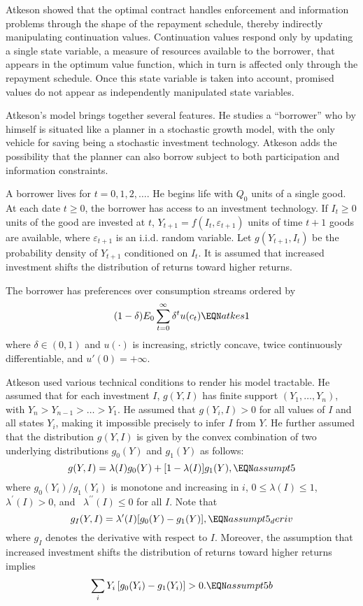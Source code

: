 Atkeson showed that the optimal contract  handles enforcement and information problems
through the shape of the repayment schedule, thereby indirectly manipulating continuation values.
  Continuation values respond only by updating
a single state variable, a measure of resources available to the
borrower, that appears in the optimum value function, which in turn
is affected only through the repayment schedule.  Once this state
variable is taken into account, promised values do not appear as
independently manipulated state variables.

Atkeson's model brings together several features.  He studies
a ``borrower'' who by himself is situated like a planner
in a stochastic growth model, with the only vehicle for saving
being a stochastic investment technology.  Atkeson adds the
possibility that the planner can also borrow
subject to both participation and information constraints.

A borrower lives for $t=0,1,2,\ldots $.  He begins life with $Q_{0}$
units of a single good.  At each date $t\geq 0$, the borrower has access
to an investment technology.  If $I_t\geq 0$ units of the good are
invested at  $t$, $Y_{t+1}=f(I_{t},\varepsilon_{t+1})$
units of time $t+1$  goods are available, where $\varepsilon_{t+1}$ is
an i.i.d. random variable.
  Let  $g(Y_{t+1}, I_{t})$ be the
probability density of  $Y_{t+1}$  conditioned on  $I_{t}$. It is
assumed that increased investment shifts the distribution of returns
toward higher returns.

  The borrower has preferences over consumption streams ordered by
$$  (1-\delta)E_0 \sum_{t=0}^\infty \delta^t u(c_t) \EQN atkes1 $$
where $\delta \in (0,1)$ and $u(\cdot)$ is increasing, strictly concave,
twice continuously differentiable, and $u'(0) = +\infty$.

Atkeson used various technical conditions to render his model
tractable. He assumed that for each investment $I$, $g(Y, I)$
 has finite support  $\left(Y_{1},\ldots, Y_{n}\right)$, with
$Y_n > Y_{n-1} > \ldots >Y_1$.  He assumed that  $g(Y_{i}, I)>0$
  for all values of  $I$ and all states $Y_{i}$, making it
impossible precisely to infer $I$  from $Y$.
He further assumed that the distribution $g\left( Y,  I\right)$
is given by the convex combination of two underlying distributions
$g_0(Y)$ and $g_1(Y)$ as follows:
$$g( Y, I) =\lambda(I) g_{0}(Y)
+[1-\lambda( I) ] g_{1}( Y),  \EQN assumpt5 $$
where $g_{0}(Y_i)/g_1(Y_i) $  is monotone  and increasing
in  $i$,  $0\leq \lambda(I) \leq 1$, $\lambda^{\prime}
\left( I\right) >0$,  and \ $\lambda^{\prime \prime }\left( I\right) \leq
0 $  for all  $I$.   Note that
$$
g_I(Y,I) = \lambda'(I) [g_0(Y) - g_1(Y)],  \EQN assumpt5_deriv
$$
where $g_I$ denotes the derivative with respect to $I$. Moreover,
the assumption that increased investment shifts the distribution
of returns toward higher returns implies
$$
\sum_i Y_i \left[g_0(Y_i) - g_1(Y_i) \right] >0.       \EQN assumpt5b
$$

